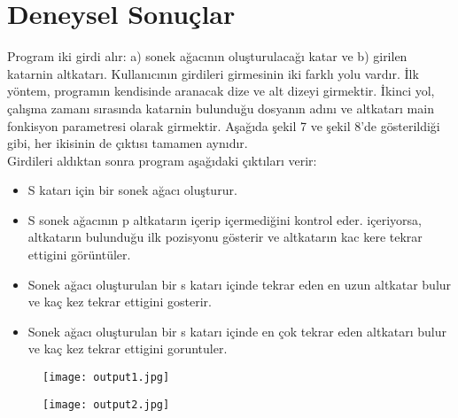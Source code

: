 \documentclass[conference]{IEEEtran}
\begin{document}
\section*{\textbf{\LARGE Deneysel Sonuçlar}}

Program iki girdi alır: a) sonek ağacının oluşturulacağı katar ve b) girilen katarnin altkatarı. Kullanıcının girdileri girmesinin iki farklı yolu vardır. İlk yöntem, programın kendisinde aranacak dize ve alt dizeyi girmektir. İkinci yol, çalışma zamanı sırasında katarnin bulunduğu dosyanın adını ve altkatarı  main fonkisyon parametresi olarak girmektir. Aşağıda şekil 7 ve şekil 8'de gösterildiği gibi, her ikisinin de çıktısı tamamen aynıdır.\\
Girdileri aldıktan sonra program aşağıdaki çıktıları verir:
\begin{itemize}
\item S katarı için bir sonek ağacı oluşturur.
\item S sonek ağacının p altkatarın içerip içermediğini kontrol eder. içeriyorsa, altkatarın bulunduğu ilk pozisyonu gösterir ve altkatarın kac kere tekrar ettigini görüntüler.
\item Sonek ağacı oluşturulan bir s katarı içinde tekrar eden en uzun altkatar bulur ve kaç kez tekrar ettigini gosterir.
\item Sonek ağacı oluşturulan bir s katarı içinde en çok tekrar eden altkatarı bulur ve kaç kez tekrar
ettigini goruntuler.
\end{itemize}
\begin{figure}[h]
    \centering
    \texttt{[image: output1.jpg]}
    \caption{}
\end{figure}

\begin{figure}[h]
    \centering
    \texttt{[image: output2.jpg]}
    \caption{}
\end{figure}

\newpage
\end{document}
